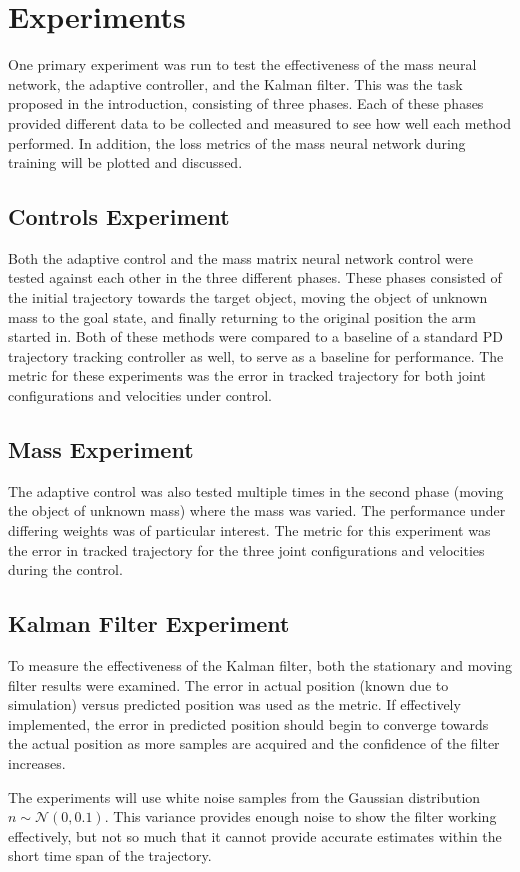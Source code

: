 \section{Experiments}
One primary experiment was run to test the effectiveness of the mass neural network, the adaptive controller, and the Kalman filter.
This was the task proposed in the introduction, consisting of three phases.
Each of these phases provided different data to be collected and measured to see how well each method performed.
In addition, the loss metrics of the mass neural network during training will be plotted and discussed.

\subsection*{Controls Experiment}
Both the adaptive control and the mass matrix neural network control were tested against each other in the three different phases.
These phases consisted of the initial trajectory towards the target object, moving the object of unknown mass to the goal state, and finally returning to the original position the arm started in.
Both of these methods were compared to a baseline of a standard PD trajectory tracking controller as well, to serve as a baseline for performance.
The metric for these experiments was the error in tracked trajectory for both joint configurations and velocities under control.

\subsection*{Mass Experiment}
The adaptive control was also tested multiple times in the second phase (moving the object of unknown mass) where the mass was varied.
The performance under differing weights was of particular interest.
The metric for this experiment was the error in tracked trajectory for the three joint configurations and velocities during the control.

\subsection*{Kalman Filter Experiment}
To measure the effectiveness of the Kalman filter, both the stationary and moving filter results were examined.
The error in actual position (known due to simulation) versus predicted position was used as the metric.
If effectively implemented, the error in predicted position should begin to converge towards the actual position as more samples are acquired and the confidence of the filter increases.

The experiments will use white noise samples from the Gaussian distribution $n\sim \mathcal{N}(0,0.1)$.
This variance provides enough noise to show the filter working effectively, but not so much that it cannot provide accurate estimates within the short time span of the trajectory.


